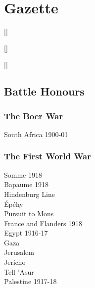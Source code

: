 \part{Gazette}
\begingroup

\titleformat{\chapter}[display]{\Huge\bf}{}{0mm}{\centering}[]
\titlespacing{\chapter}{0mm}{0mm}{5mm}

\titleformat{\section}[display]{\Large\bf}{}{0mm}{\centering}[]
\titleformat{\subsection}[display]{\large\bf}{}{0mm}{\centering}[]

\chapter{Battle Honours}

\section*{The Boer War}

\begin{center}
  South Africa 1900-01
\end{center}

\section*{The First World War}

\begin{center}
  Somme 1918 \\
  Bapaume 1918 \\
  Hindenburg Line \\
  Épéhy \\
  Pursuit to Mons \\
  France and Flanders 1918 \\
  Egypt 1916-17 \\
  Gaza \\
  Jerusalem \\
  Jericho \\
  Tell 'Asur \\
  Palestine 1917-18
\end{center}

